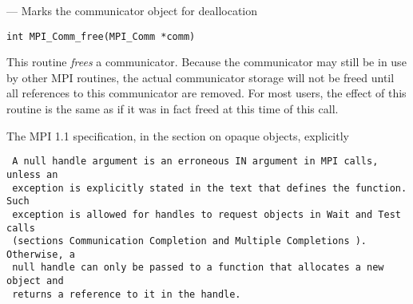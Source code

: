 \startmanpage
{}
--- Marks the communicator object for deallocation 
\startvb\begin{verbatim}
int MPI_Comm_free(MPI_Comm *comm)

\end{verbatim}
\endvb

\par
{}
This routine {\em frees} a communicator.  Because the communicator may still
be in use by other MPI routines, the actual communicator storage will not
be freed until all references to this communicator are removed.  For most
users, the effect of this routine is the same as if it was in fact freed
at this time of this call.
\par
{}
The MPI 1.1 specification, in the section on opaque objects, explicitly
\begin{verbatim}
 A null handle argument is an erroneous IN argument in MPI calls, unless an
 exception is explicitly stated in the text that defines the function. Such
 exception is allowed for handles to request objects in Wait and Test calls
 (sections Communication Completion and Multiple Completions ). Otherwise, a
 null handle can only be passed to a function that allocates a new object and
 returns a reference to it in the handle.
\end{verbatim}

